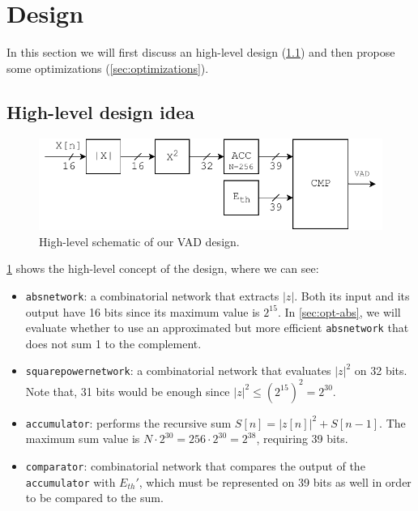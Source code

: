 \section{Design}
In this section we will first discuss an high-level design (\ref{sec:high-level})
and then propose some optimizations (\ref{sec:optimizations}).

\subsection{High-level design idea}
\label{sec:high-level}

\begin{figure}[h!]
  \centering
  \includegraphics{figs/vad_simple_schematic.pdf}
  \caption{High-level schematic of our VAD design.}
  \label{fig:simple_schematic}
\end{figure}

\cref{fig:simple_schematic} shows the high-level concept of the design, where we 
can see:
\begin{itemize}
  \item \texttt{absnetwork}: a combinatorial network that extracts $|z|$. Both 
    its input and its output have 16 bits since its maximum value is $2^{15}$. 
    In \cref{sec:opt-abs}, we will evaluate whether to use an approximated 
    but more efficient \texttt{absnetwork} that does not sum 1 to the complement.
  \item \texttt{squarepowernetwork}: a combinatorial network that evaluates
    $|z|^2$ on 32 bits. Note that, 31 bits would be enough since 
    $|z|^2 \le (2^{15})^2 = 2^{30}$.
  \item \texttt{accumulator}: performs the recursive sum $S[n] = |z[n]|^2 + S[n - 1]$.
    The maximum sum value is $N \cdot 2^{30} = 256 \cdot 2^{30} = 2^{38}$, 
    requiring 39 bits.
  \item \texttt{comparator}: combinatorial network that compares the output
    of the \texttt{accumulator} with $E_{th}'$, which must be represented on 39
    bits as well in order to be compared to the sum.
\end{itemize}


